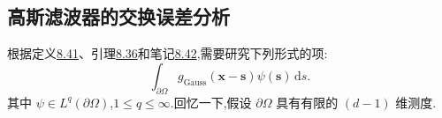 \subsection{高斯滤波器的交换误差分析}
\label{subsec:gaussian-filter-commutation-error}

\begin{note}[待研究的项]
\label{note:commutation-term-studied}
根据定义\hyperref[def:les-commutation-error]{8.41}、引理\hyperref[lem:les-normal-stress-regularity]{8.36}和笔记\hyperref[note:remarks-on-commutation-error]{8.42},需要研究下列形式的项:
\begin{equation}\label{eq:commutation-error-integral}
 \int_{\partial\Omega}
   g_{\mathrm{Gauss}}(\bm{x}-\bm{s})\psi(\bm{s})\,\mathrm{d}s.
\end{equation}
其中 $\psi\in L^q(\partial\Omega)$,$1\le q\le\infty$.回忆一下,假设 $\partial\Omega$ 具有有限的 $(d-1)$ 维测度.
\end{note}

